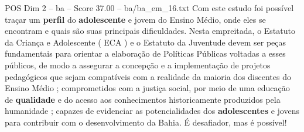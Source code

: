 \begin{textsample}{POS Dim 2 – ba – Score 37.00 – ba/ba\_em\_16.txt}
Com este estudo foi possível traçar um \textbf{perfil} do \textbf{adolescente} e jovem do Ensino Médio, onde eles se encontram e quais são suas principais dificuldades.
Nesta empreitada, o Estatuto da Criança e Adolescente ( ECA ) e o Estatuto da Juventude devem ser peças fundamentais para orientar a elaboração de Políticas Públicas voltadas a esses públicos, de modo a assegurar a concepção e a implementação de projetos pedagógicos que sejam compatíveis com a realidade da maioria dos discentes do Ensino Médio ; comprometidos com a justiça social, por meio de uma educação de \textbf{qualidade} e do acesso aos conhecimentos historicamente produzidos pela humanidade ; capazes de evidenciar as potencialidades dos \textbf{adolescentes} e jovens para contribuir com o desenvolvimento da Bahia.
É desafiador, mas é possível!

\end{textsample}

